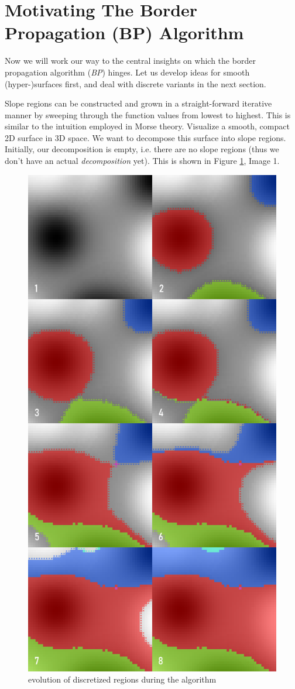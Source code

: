 \documentclass[11pt,twoside,twocolumn,a4paper]{article}
\theoremstyle{plain}
\theoremstyle{definition}
\begin{document}
\section{Motivating The Border Propagation (BP) Algorithm}
\label{sec:motivating_BP}

Now we will work our way to the central insights on which the border propagation algorithm (\emph{BP}) hinges.
Let us develop ideas for smooth (hyper-)surfaces first, and deal with discrete variants in the next section.

Slope regions can be constructed and grown in a straight-forward iterative manner by sweeping through the function values from lowest to highest. 
This is similar to the intuition employed in Morse theory\cite{MatsumotoYukio2002AitM}.
Visualize a smooth, compact 2D surface in 3D space.
We want to decompose this surface into slope regions.
Initially, our decomposition is empty, i.e. there are no slope regions (thus we don't have an actual \emph{decomposition} yet).
This is shown in Figure \ref{fig:evolution}, Image 1.

\begin{figure}
\centering
\includegraphics[width=0.70\columnwidth]{img/slope_evolution.png}
\caption{evolution of discretized regions during the algorithm}
\label{fig:evolution}
\end{figure}
\end{document}
